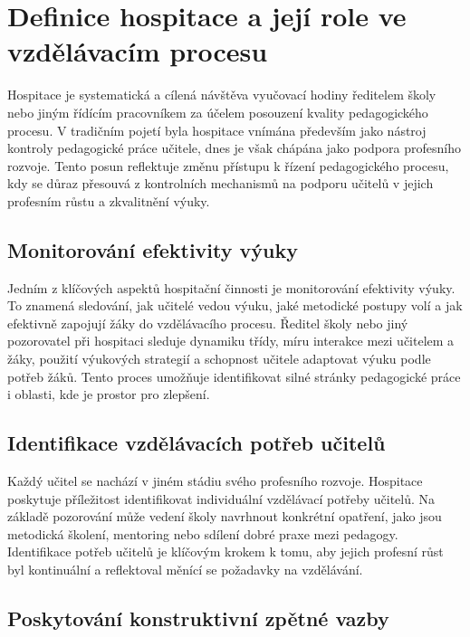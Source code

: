\setcounter{page}{1}

\section{Definice hospitace a její role ve vzdělávacím procesu}

Hospitace je systematická a cílená návštěva vyučovací hodiny ředitelem školy nebo jiným řídícím pracovníkem za účelem posouzení kvality pedagogického procesu. V tradičním pojetí byla hospitace vnímána především jako nástroj kontroly pedagogické práce učitele, dnes je však chápána jako podpora profesního rozvoje. Tento posun reflektuje změnu přístupu k řízení pedagogického procesu, kdy se důraz přesouvá z kontrolních mechanismů na podporu učitelů v jejich profesním růstu a zkvalitnění výuky.

\subsection{Monitorování efektivity výuky}

Jedním z klíčových aspektů hospitační činnosti je monitorování efektivity výuky. To znamená sledování, jak učitelé vedou výuku, jaké metodické postupy volí a jak efektivně zapojují žáky do vzdělávacího procesu. Ředitel školy nebo jiný pozorovatel při hospitaci sleduje dynamiku třídy, míru interakce mezi učitelem a žáky, použití výukových strategií a schopnost učitele adaptovat výuku podle potřeb žáků. Tento proces umožňuje identifikovat silné stránky pedagogické práce i oblasti, kde je prostor pro zlepšení.

\subsection{Identifikace vzdělávacích potřeb učitelů}

Každý učitel se nachází v jiném stádiu svého profesního rozvoje. Hospitace poskytuje příležitost identifikovat individuální vzdělávací potřeby učitelů. Na základě pozorování může vedení školy navrhnout konkrétní opatření, jako jsou metodická školení, mentoring nebo sdílení dobré praxe mezi pedagogy. Identifikace potřeb učitelů je klíčovým krokem k tomu, aby jejich profesní růst byl kontinuální a reflektoval měnící se požadavky na vzdělávání.

\subsection{Poskytování konstruktivní zpětné vazby}

